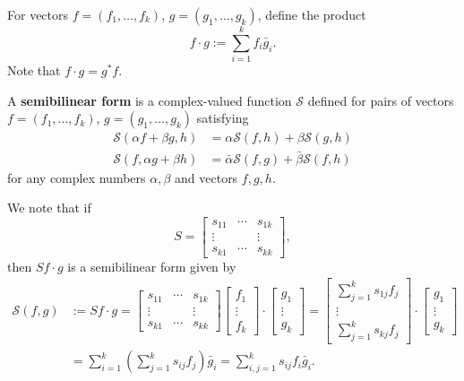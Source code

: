 \documentclass[11pt, oneside, a4paper]{article}
\begin{document}
\begin{defn}\label{defn:f cdot g}
    For vectors $f=(f_1,\ldots,f_k)$, $g=(g_1,\ldots,g_k)$, define the product
    \[f\cdot g:=\sum_{i=1}^k f_i\bar{g}_i.\]
    Note that $f\cdot g = g^*f$.
\end{defn}

\begin{defn}
    A \textbf{semibilinear form} is a complex-valued function $\mathcal{S}$ defined for pairs of vectors $f=(f_1,\ldots,f_k)$, $g=(g_1,\ldots,g_k)$ satisfying
    \begin{align*}
        \mathcal{S}(\alpha f+\beta g, h)&=\alpha\mathcal{S}(f,h) + \beta\mathcal{S}(g,h)\\
        \mathcal{S}(f, \alpha g + \beta h) &= \bar{\alpha}\mathcal{S}(f,g) + \bar{\beta}\mathcal{S}(f, h)
    \end{align*}
    for any complex numbers $\alpha, \beta$ and vectors $f,g,h$.
\end{defn}
We note that if
\[S = \begin{bmatrix}
    s_{11} & \cdots & s_{1k}\\
    \vdots &  & \vdots\\
    s_{k1} & \cdots & s_{kk}
\end{bmatrix},\]
then $Sf\cdot g$ is a semibilinear form given by
\begin{equation}\label{eq:semibilinear form}
    \begin{split}
    \mathcal{S}(f,g) &:= Sf\cdot g = \begin{bmatrix}
        s_{11} & \cdots & s_{1k}\\
        \vdots & & \vdots\\
        s_{k1} & \cdots & s_{kk}
    \end{bmatrix} \begin{bmatrix}
        f_1\\
        \vdots\\
        f_k
    \end{bmatrix} \cdot \begin{bmatrix}
        g_1\\
        \vdots\\
        g_k
    \end{bmatrix} = \begin{bmatrix}
        \sum_{j=1}^k s_{1j}f_j\\
        \vdots\\
        \sum_{j=1}^k s_{kj}f_j
    \end{bmatrix}\cdot \begin{bmatrix}
        g_1\\
        \vdots\\
        g_k
    \end{bmatrix}\\
    &= \sum_{i=1}^k\left(\sum_{j=1}^k s_{ij}f_j\right)\bar{g}_i =\sum_{i,j=1}^k s_{ij}f_i\bar{g}_i. 
    \end{split}
\end{equation}
\end{document}
